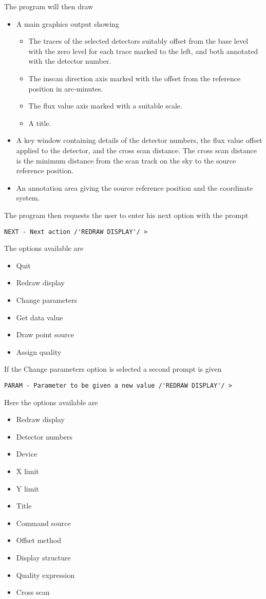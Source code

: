 \documentclass[twoside,11pt]{article}
\begin{document}
The program will then draw
\begin{itemize}
\item A main graphics output showing
\begin{itemize}
\item The traces of the selected detectors suitably offset from the base level
with the zero level for each trace marked to the left, and both annotated with 
the detector number.
\item The inscan direction axis marked with the offset from the reference 
position in arc-minutes.
\item The flux value axis marked with a suitable scale.
\item A title.
\end{itemize}
\item A key window containing details of the detector numbers, the flux value 
offset applied to the detector, and the cross scan distance. The cross scan 
distance is the minimum distance from the scan track on the sky to the source
reference position.
\item An annotation area giving the source reference position and the 
coordinate system.
\end{itemize}
The program then requests the user to enter his next option with the prompt
\begin{small}
\begin{verbatim}
NEXT - Next action /'REDRAW DISPLAY'/ > 
\end{verbatim}
\end{small}
The options available are
\begin{itemize}
\item Quit
\item Redraw display
\item Change parameters
\item Get data value
\item Draw point source
\item Assign quality
\end{itemize}
If the Change parameters option is selected a second prompt is given
\begin{small}
\begin{verbatim}
PARAM - Parameter to be given a new value /'REDRAW DISPLAY'/ > 
\end{verbatim}
\end{small}
Here the options available are
\begin{itemize}
\item Redraw display
\item Detector numbers
\item Device
\item X limit
\item Y limit
\item Title
\item Command source
\item Offset method
\item Display structure
\item Quality expression
\item Cross scan
\end{itemize}
\end{document}
